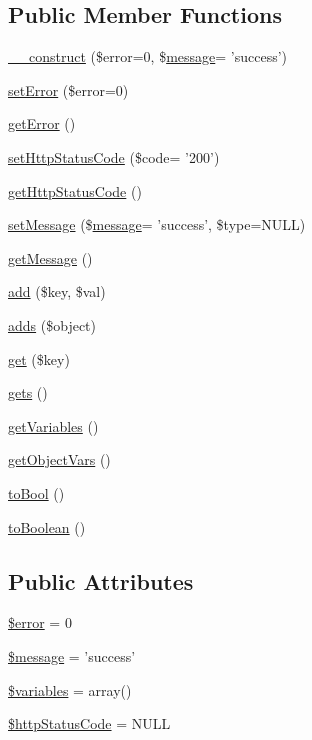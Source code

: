 \subsection*{Public Member Functions}
\begin{DoxyCompactItemize}
\item 
\hyperlink{classBaseObject_a827fd6c7d66ed5a1058cead90f65f0af}{\-\_\-\-\_\-construct} (\$error=0, \$\hyperlink{classmessage}{message}= 'success')
\item 
\hyperlink{classBaseObject_a577cc2f5a02da2517064d5ef2b7ccb10}{set\-Error} (\$error=0)
\item 
\hyperlink{classBaseObject_ac1db37d493b5c57a66d305e3cbe46ac0}{get\-Error} ()
\item 
\hyperlink{classBaseObject_a262e90f548db2253329e59c85a2bcf25}{set\-Http\-Status\-Code} (\$code= '200')
\item 
\hyperlink{classBaseObject_a3ebcd21b0d840ae7d24c98281ac19477}{get\-Http\-Status\-Code} ()
\item 
\hyperlink{classBaseObject_abf6832e1ef289490457ed894f4a90464}{set\-Message} (\$\hyperlink{classmessage}{message}= 'success', \$type=N\-U\-L\-L)
\item 
\hyperlink{classBaseObject_a2b3adbab6ff8d15803155626b32d7148}{get\-Message} ()
\item 
\hyperlink{classBaseObject_ac53ea9b2ac26d103f2b0217e9496a93d}{add} (\$key, \$val)
\item 
\hyperlink{classBaseObject_aff5d8051f1103233227d961e7afbdf86}{adds} (\$object)
\item 
\hyperlink{classBaseObject_ae3d773eeb5f3c304272906c7e82b3ad2}{get} (\$key)
\item 
\hyperlink{classBaseObject_a203fa9ac086bbd6954d91a92112b6960}{gets} ()
\item 
\hyperlink{classBaseObject_a1bfae4a5df64b81bebbe9c5a2ad4753c}{get\-Variables} ()
\item 
\hyperlink{classBaseObject_af807e6781ea33295f27d2b63b2b0cda5}{get\-Object\-Vars} ()
\item 
\hyperlink{classBaseObject_ab87cf5d350ef2a146e1ec3af90b62187}{to\-Bool} ()
\item 
\hyperlink{classBaseObject_ad0751b0da3686f08ff9b3bc031776d4d}{to\-Boolean} ()
\end{DoxyCompactItemize}
\subsection*{Public Attributes}
\begin{DoxyCompactItemize}
\item 
\hyperlink{classBaseObject_a631aef600744fc45e54696f0aa31de40}{\$error} = 0
\item 
\hyperlink{classBaseObject_a74c72729f60c2ba14879a9311ac77419}{\$message} = 'success'
\item 
\hyperlink{classBaseObject_a4b5e3eabeb5a42286650df6636001a0b}{\$variables} = array()
\item 
\hyperlink{classBaseObject_aa84e26782db1a911815cd6b9a5a093f9}{\$http\-Status\-Code} = N\-U\-L\-L
\end{DoxyCompactItemize}



